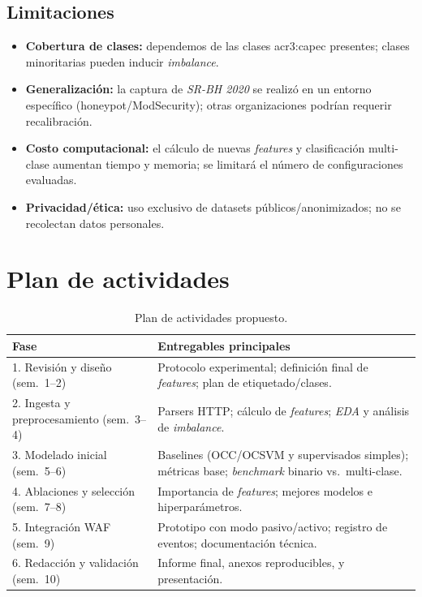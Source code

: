 \subsection*{Limitaciones}
\begin{itemize}
  \item \textbf{Cobertura de clases:} dependemos de las clases \gls{acr3:capec} presentes; clases minoritarias pueden inducir \emph{imbalance}.
  \item \textbf{Generalización:} la captura de \textit{SR-BH 2020} se realizó en un entorno específico (honeypot/ModSecurity); otras organizaciones podrían requerir recalibración.
  \item \textbf{Costo computacional:} el cálculo de nuevas \textit{features} y clasificación multi-clase aumentan tiempo y memoria; se limitará el número de configuraciones evaluadas.
  \item \textbf{Privacidad/ética:} uso exclusivo de datasets públicos/anonimizados; no se recolectan datos personales.
\end{itemize}

\section{Plan de actividades}

\begin{table}[ht]
\centering
\begin{tabular}{|p{5cm}|p{8cm}|}
\hline
\textbf{Fase} & \textbf{Entregables principales} \\
\hline
1. Revisión y diseño (sem.\ 1--2) & Protocolo experimental; definición final de \textit{features}; plan de etiquetado/clases. \\
\hline
2. Ingesta y preprocesamiento (sem.\ 3--4) & Parsers HTTP; cálculo de \textit{features}; \textit{EDA} y análisis de \emph{imbalance}. \\
\hline
3. Modelado inicial (sem.\ 5--6) & Baselines (OCC/OCSVM y supervisados simples); métricas base; \textit{benchmark} binario vs.\ multi-clase. \\
\hline
4. Ablaciones y selección (sem.\ 7--8) & Importancia de \textit{features}; mejores modelos e hiperparámetros. \\
\hline
5. Integración WAF (sem.\ 9) & Prototipo con modo pasivo/activo; registro de eventos; documentación técnica. \\
\hline
6. Redacción y validación (sem.\ 10) & Informe final, anexos reproducibles, y presentación. \\
\hline
\end{tabular}
\caption{Plan de actividades propuesto.}
\label{tbl:plan}
\end{table}

